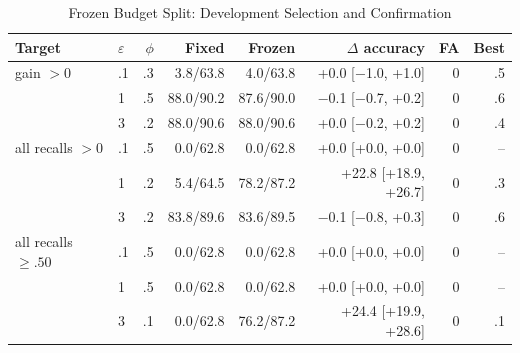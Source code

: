 \begin{table}[t]
\caption{Frozen Budget Split: Development Selection and Confirmation}
\label{tab:budgetconf}\small\setlength{\tabcolsep}{1.8pt}
\centering
\begin{tabular}{@{}llrrrrrr@{}}\toprule
Target & $\varepsilon$ & $\phi$ & Fixed & Frozen & $\Delta$ accuracy & FA & Best \\
\midrule
gain $>0$ & .1 & .3 & 3.8/63.8 & 4.0/63.8 & +0.0 [$-$1.0, +1.0] & 0 & .5 \\
 & 1 & .5 & 88.0/90.2 & 87.6/90.0 & $-$0.1 [$-$0.7, +0.2] & 0 & .6 \\
 & 3 & .2 & 88.0/90.6 & 88.0/90.6 & +0.0 [$-$0.2, +0.2] & 0 & .4 \\
all recalls $>0$ & .1 & .5 & 0.0/62.8 & 0.0/62.8 & +0.0 [+0.0, +0.0] & 0 & -- \\
 & 1 & .2 & 5.4/64.5 & 78.2/87.2 & +22.8 [+18.9, +26.7] & 0 & .3 \\
 & 3 & .2 & 83.8/89.6 & 83.6/89.5 & $-$0.1 [$-$0.8, +0.3] & 0 & .6 \\
all recalls $\ge.50$ & .1 & .5 & 0.0/62.8 & 0.0/62.8 & +0.0 [+0.0, +0.0] & 0 & -- \\
 & 1 & .5 & 0.0/62.8 & 0.0/62.8 & +0.0 [+0.0, +0.0] & 0 & -- \\
 & 3 & .1 & 0.0/62.8 & 76.2/87.2 & +24.4 [+19.9, +28.6] & 0 & .1 \\
\bottomrule\end{tabular}
\end{table}
